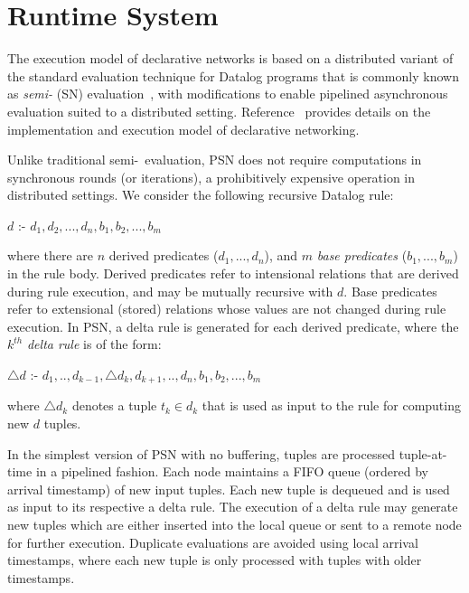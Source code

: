 \section{Runtime System}

The execution model of declarative networks is based on a distributed
variant of the standard evaluation technique for Datalog programs that
is commonly known as {\em semi-\naive} (SN)
evaluation~\cite{declareNetworks}, with modifications to enable
pipelined asynchronous evaluation suited to a distributed setting.
Reference~\cite{declareNetworks} provides details on the implementation
and execution model of declarative networking.

Unlike traditional semi-\naive\ evaluation, PSN does not require
computations in synchronous rounds (or iterations), a prohibitively
expensive operation in distributed settings.  We consider the following
recursive Datalog rule:


\begin{center}$d $ :- $ d_{1}, d_{2}, ..., d_{n}, b_{1}, b_{2}, ..., b_{m}$\end{center}

\noindent where there are $n$ derived predicates ($d_{1},...,d_{n}$),
and $m$ {\em base predicates} ($b_{1},...,b_{m}$) in the rule body.
Derived predicates refer to intensional relations that are derived
during rule execution, and may be mutually recursive with $d$.  Base
predicates refer to extensional (stored) relations whose values are not
changed during rule execution.  In PSN, a delta rule is generated for
each derived predicate, where the $k^{th}$ {\em delta rule} is of the
form:
\begin{center}$\triangle d$ :- $ d_{1},..,d_{k-1},\triangle d_{k}, d_{k+1},..,d_{n},
b_{1},b_{2},...,b_{m}$\end{center}

\noindent where $\triangle d_{k}$ denotes a tuple $t_{k} \in d_{k}$ that is used as
input to the rule for computing new $d$ tuples.

In the simplest version of PSN with no buffering, tuples are processed
tuple-at-time in a pipelined fashion.  Each node maintains a FIFO queue
(ordered by arrival timestamp) of new input tuples.  Each new tuple is
dequeued and is used as input to its respective a delta rule.  The
execution of a delta rule may generate new tuples which are either
inserted into the local queue or sent to a remote node for further
execution.  Duplicate evaluations are avoided using local arrival
timestamps, where each new tuple is only processed with tuples with
older timestamps.


